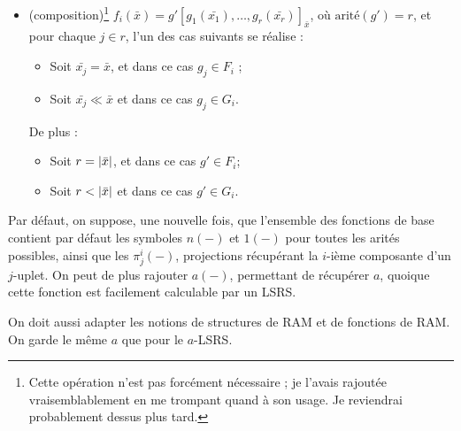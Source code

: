 \documentclass{report}
\begin{document}
\begin{definition}[$a$-LSRS]
\begin{itemize}[itemsep=-1mm]
				\item 	(composition)\footnote{Cette opération n'est pas forcément nécessaire ; je l'avais rajoutée vraisemblablement en me trompant quand à son usage. Je reviendrai probablement dessus plus tard.}
					$f_i\left(\bar{x}\right) = g'\left[ g_1\left(\bar{x_1}\right), \dots, g_r\left(\bar{x_r}\right) \right]_{\bar{x}}$, où $\text{arité}(g') = r$, et pour chaque $j \in r$, l'un des cas suivants se réalise : 
						\begin{itemize}
							\item 	Soit $\bar{x_j} = \bar{x}$, et dans ce cas $g_j \in F_i$ ;
							\item 	Soit $\bar{x_j} \ll \bar{x}$ et dans ce cas $g_j \in G_i$. 
						\end{itemize}
						De plus :
						\begin{itemize}
							\item 	Soit $r = \left|\bar{x}\right|$, et dans ce cas $g' \in F_i$\footnotemark ;
							\item 	Soit $r < \left|\bar{x}\right|$ et dans ce cas $g' \in G_i$. 
						\end{itemize}
						
			\end{itemize}
			
		\end{definition}
		
		\begin{remark}
			\label{rk:fonctions_de_base_LSRS}
			Par défaut, on suppose, une nouvelle fois, que l'ensemble des fonctions de base contient par défaut les symboles $n(-)$ et $1(-)$ pour toutes les arités possibles, ainsi que les $\pi^i_j(-)$, projections récupérant la $i$-ième composante d'un $j$-uplet. On peut de plus rajouter $a(-)$, permettant de récupérer $a$, quoique cette fonction est facilement calculable par un LSRS.
		\end{remark}
		
		On doit aussi adapter les notions de structures de RAM et de fonctions de RAM. On garde le même $a$ que pour le $a$-LSRS.
		
\end{document}
